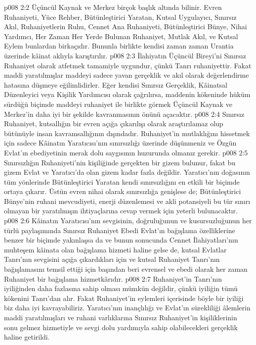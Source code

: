 \vs p008 2:2 Üçüncül Kaynak ve Merkez birçok başlık altında bilinir. Evren Ruhaniyeti, Yüce Rehber, Bütünleştirici Yaratan, Kutsal Uygulayıcı, Sınırsız Akıl, Ruhaniyetlerin Ruhu, Cennet Ana Ruhaniyeti, Bütünleştirici Bünye, Nihai Yardımcı, Her Zaman Her Yerde Bulunan Ruhaniyet, Mutlak Akıl, ve Kutsal Eylem bunlardan birkaçıdır. Bununla birlikte kendisi zaman zaman Urantia üzerinde kâinat aklıyla karıştırılır.
\vs p008 2:3 İlahiyatın Üçüncül Bireyi’ni Sınırsız Ruhaniyet olarak atfetmek tamamiyle uygundur, çünkü Tanrı ruhaniyettir. Fakat maddi yaratılmışlar maddeyi sadece yavan gerçeklik ve akıl olarak değerlendirme hatasına düşmeye eğilimlidirler. Eğer kendisi Sınırsız Gerçeklik, Kâinatsal Düzenleyici veya Kişilik Yardımcısı olarak çağrılırsa, maddenin kökeninde hüküm sürdüğü biçimde maddeyi ruhaniyet ile birlikte görmek Üçüncül Kaynak ve Merkez’in daha iyi bir şekilde kavranmasının önünü açacaktır.
\vs p008 2:4 Sınırsız Ruhaniyet, kutsallığın bir evren açığa çıkarılışı olarak araştırılamaz olup bütünüyle insan kavramsallığının dışındadır. Ruhaniyet’in mutlaklığını hissetmek için sadece Kâinatın Yaratıcısı’nın sınırsızlığı üzerinde düşünmeniz ve Özgün Evlat’ın ebediyetinin merak dolu saygısının huzurunda olmanız gerekir.
\vs p008 2:5 Sınırsızlığın Ruhaniyeti’nin kişiliğinde gerçekten bir gizem bulunur, fakat bu gizem Evlat ve Yaratıcı’da olan gizem kadar fazla değildir. Yaratıcı’nın doğasının tüm yönlerinde Bütünleştirici Yaratan kendi sınırsızlığını en etkili bir biçimde ortaya çıkarır. Üstün evren nihai olarak sınırsızlığa genişlese de; Bütünleştirici Bünye’nin ruhani mevcudiyeti, enerji düzenlemesi ve akli potansiyeli bu tür sınırı olmayan bir yaratılmışın ihtiyaçlarına cevap vermek için yeterli bulunacaktır.
\vs p008 2:6 Kâinatın Yaratıcısı’nın sevgisinin, doğruluğunun ve kusursuzluğunun her türlü paylaşımında Sınırsız Ruhaniyet Ebedi Evlat’ın bağışlama özelliklerine benzer bir biçimde yakınlaşsa da ve bunun sonucunda Cennet İlahiyatları’nın muhteşem kâinata olan bağışlama hizmeti haline gelse de, kutsal Evlatlar Tanrı’nın sevgisini açığa çıkardıkları için ve kutsal Ruhaniyet Tanrı’nın bağışlamasını temsil ettiği için başından beri evrensel ve ebedi olarak her zaman Ruhaniyet bir bağışlama hizmetkârıdır.
\vs p008 2:7 Ruhaniyet’in Tanrı’nın iyiliğinden daha fazlasına sahip olması mümkün değildir, çünkü iyiliğin tümü kökenini Tanrı’dan alır. Fakat Ruhaniyet’in eylemleri içerisinde böyle bir iyiliği biz daha iyi kavrayabiliriz. Yaratıcı’nın inançlılığı ve Evlat’ın sürekliliği âlemlerin maddi yaratılmışları ve ruhani varlıklarına Sınırsız Ruhaniyet’in kişiliklerinin sonu gelmez hizmetiyle ve sevgi dolu yardımıyla sahip olabilecekleri gerçeklik haline getirildi.
